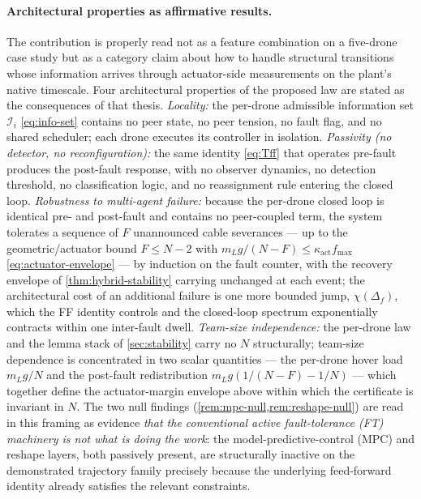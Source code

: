 \paragraph{Architectural properties as affirmative results.}
The contribution is properly read not as a feature combination on a five-drone case study but as a category claim about how to handle structural transitions whose information arrives through actuator-side measurements on the plant's native timescale. Four architectural properties of the proposed law are stated as the consequences of that thesis. \emph{Locality:} the per-drone admissible information set $\mathcal{I}_i$ \eqref{eq:info-set} contains no peer state, no peer tension, no fault flag, and no shared scheduler; each drone executes its controller in isolation. \emph{Passivity (no detector, no reconfiguration):} the same identity \eqref{eq:Tff} that operates pre-fault produces the post-fault response, with no observer dynamics, no detection threshold, no classification logic, and no reassignment rule entering the closed loop. \emph{Robustness to multi-agent failure:} because the per-drone closed loop is identical pre- and post-fault and contains no peer-coupled term, the system tolerates a sequence of $F$ unannounced cable severances --- up to the geometric/actuator bound $F \le N - 2$ with $m_L g/(N{-}F) \le \kappa_{\mathrm{act}} f_{\max}$ \eqref{eq:actuator-envelope} --- by induction on the fault counter, with the recovery envelope of \cref{thm:hybrid-stability} carrying unchanged at each event; the architectural cost of an additional failure is one more bounded jump, $\chi(\Delta_f)$, which the FF identity controls and the closed-loop spectrum exponentially contracts within one inter-fault dwell. \emph{Team-size independence:} the per-drone law and the lemma stack of \cref{sec:stability} carry no $N$ structurally; team-size dependence is concentrated in two scalar quantities --- the per-drone hover load $m_L g/N$ and the post-fault redistribution $m_L g(1/(N{-}F) - 1/N)$ --- which together define the actuator-margin envelope above within which the certificate is invariant in $N$. The two null findings (\cref{rem:mpc-null,rem:reshape-null}) are read in this framing as evidence \emph{that the conventional active fault-tolerance (FT) machinery is not what is doing the work}: the model-predictive-control (MPC) and reshape layers, both passively present, are structurally inactive on the demonstrated trajectory family precisely because the underlying feed-forward identity already satisfies the relevant constraints.


